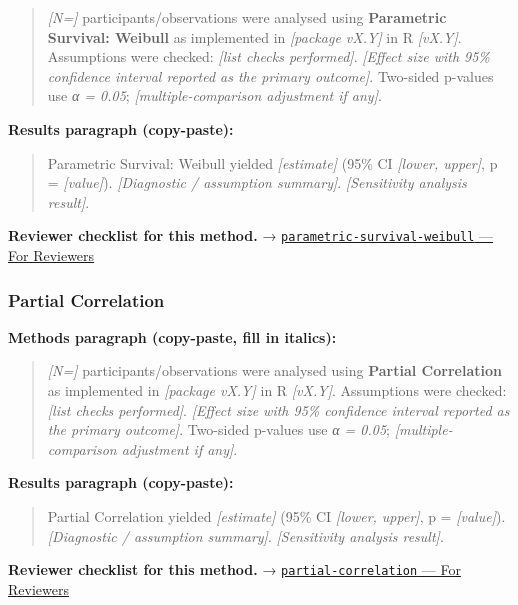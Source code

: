 \documentclass[
]{article}
\begin{document}
\begin{quote}
\emph{{[}N={]}} participants/observations were analysed using
\textbf{Parametric Survival: Weibull} as implemented in \emph{{[}package
vX.Y{]}} in R \emph{{[}vX.Y{]}}. Assumptions were checked: \emph{{[}list
checks performed{]}}. \emph{{[}Effect size with 95\% confidence interval
reported as the primary outcome{]}}. Two-sided p-values use \emph{α =
0.05}; \emph{{[}multiple-comparison adjustment if any{]}}.
\end{quote}

\textbf{Results paragraph (copy-paste):}

\begin{quote}
Parametric Survival: Weibull yielded \emph{{[}estimate{]}} (95\% CI
\emph{{[}lower, upper{]}}, p = \emph{{[}value{]}}). \emph{{[}Diagnostic
/ assumption summary{]}}. \emph{{[}Sensitivity analysis result{]}}.
\end{quote}

\textbf{Reviewer checklist for this method.} →
\href{../chapters/11-survival/parametric-survival-weibull.Rmd\#for-reviewers}{\texttt{parametric-survival-weibull}
--- For Reviewers}

\subsubsection{Partial Correlation}\label{partial-correlation}

\textbf{Methods paragraph (copy-paste, fill in italics):}

\begin{quote}
\emph{{[}N={]}} participants/observations were analysed using
\textbf{Partial Correlation} as implemented in \emph{{[}package vX.Y{]}}
in R \emph{{[}vX.Y{]}}. Assumptions were checked: \emph{{[}list checks
performed{]}}. \emph{{[}Effect size with 95\% confidence interval
reported as the primary outcome{]}}. Two-sided p-values use \emph{α =
0.05}; \emph{{[}multiple-comparison adjustment if any{]}}.
\end{quote}

\textbf{Results paragraph (copy-paste):}

\begin{quote}
Partial Correlation yielded \emph{{[}estimate{]}} (95\% CI
\emph{{[}lower, upper{]}}, p = \emph{{[}value{]}}). \emph{{[}Diagnostic
/ assumption summary{]}}. \emph{{[}Sensitivity analysis result{]}}.
\end{quote}

\textbf{Reviewer checklist for this method.} →
\href{../chapters/07-regression/partial-correlation.Rmd\#for-reviewers}{\texttt{partial-correlation}
--- For Reviewers}
\end{document}

